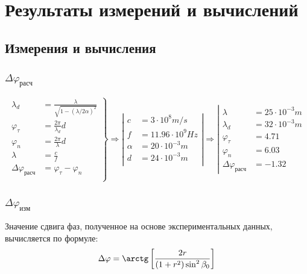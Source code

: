 \documentclass[11pt,a4paper,oneside, reqno]{amsproc}
\renewcommand{\phi}{\varphi}
\begin{document}
\newpage
\section{Результаты измерений и вычислений}
\subsection{Измерения и вычисления}
\subsubsection{$\Delta\phi_{расч}$}
$$
\left.
\begin{aligned}
    \lambda_d &=\frac{\lambda}{\sqrt{1 - (\lambda/2\alpha)^2}}\\
    \phi_\tau &=\frac{2\pi}{\lambda_d}d\\
    \phi_n &= \frac{2\pi}{\lambda}d\\
    \lambda &= \frac{c}{f}\\
    \Delta\phi_{расч} &= \phi_\tau - \phi_n\\
\end{aligned}
\right\}
\Longrightarrow
\left|
\begin{aligned}
    c &= 3\cdot10^8 m/s\\
    f &= 11.96\cdot10^9Hz\\
    \alpha &= 20\cdot10^{-3}m\\
    d &= 24\cdot10^{-3}m\\
\end{aligned}
\right|
\Longrightarrow
\left|
\begin{aligned}
    \lambda &= 25\cdot10^{-3}m\\
    \lambda_d &= 32\cdot10^{-3}m\\
    \phi_\tau &= 4.71\\
    \phi_n &= 6.03\\
    \Delta\phi_{расч} &= -1.32
\end{aligned}
\right.
$$
\vspace{10 pt}

\subsubsection{$\Delta\phi_{изм}$}
Значение сдвига фаз, полученное на основе экспериментальных данных, вычисляется по формуле:
\begin{equation}
    \Delta\phi = \arctg \left[ \frac{2r}{(1+r^2)\sin^2\beta_0} \right]
\end{equation}
\end{document}
